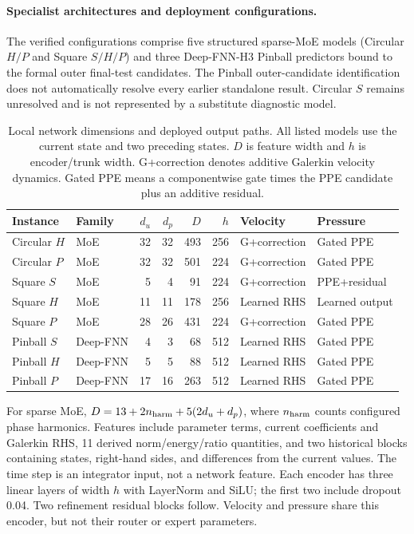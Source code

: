 \paragraph{Specialist architectures and deployment configurations.}
The verified configurations comprise five structured sparse-MoE
models (Circular $H/P$ and Square $S/H/P$) and three Deep-FNN-H3
Pinball predictors bound to the formal outer final-test candidates.
The Pinball outer-candidate identification does not automatically
resolve every earlier standalone result. Circular $S$ remains
unresolved and is not represented by a substitute diagnostic model.

\begin{table}[t]
\centering
\small
\setlength{\tabcolsep}{4pt}
\caption{Local network dimensions and deployed output paths. All
listed models use the current state and two preceding states.
$D$ is feature width and $h$ is encoder/trunk width. G+correction
denotes additive Galerkin velocity dynamics. Gated PPE means a
componentwise gate times the PPE candidate plus an additive residual.}
\label{tab:local_architecture_overview}
\begin{tabular}{@{}llrrrrll@{}}
\toprule
Instance & Family & $d_u$ & $d_p$ & $D$ & $h$ & Velocity & Pressure\\
\midrule
Circular $H$ & MoE & 32 & 32 & 493 & 256 & G+correction & Gated PPE\\
Circular $P$ & MoE & 32 & 32 & 501 & 224 & G+correction & Gated PPE\\
Square $S$ & MoE & 5 & 4 & 91 & 224 & G+correction & PPE+residual\\
Square $H$ & MoE & 11 & 11 & 178 & 256 & Learned RHS & Learned output\\
Square $P$ & MoE & 28 & 26 & 431 & 224 & G+correction & Gated PPE\\
Pinball $S$ & Deep-FNN & 4 & 3 & 68 & 512 & Learned RHS & Gated PPE\\
Pinball $H$ & Deep-FNN & 5 & 5 & 88 & 512 & Learned RHS & Gated PPE\\
Pinball $P$ & Deep-FNN & 17 & 16 & 263 & 512 & Learned RHS & Gated PPE\\
\bottomrule
\end{tabular}
\end{table}

For sparse MoE, $D=13+2n_{\rm harm}+5(2d_u+d_p)$, where
$n_{\rm harm}$ counts configured phase harmonics. Features include
parameter terms, current coefficients and Galerkin RHS, 11 derived
norm/energy/ratio quantities, and two historical blocks containing
states, right-hand sides, and differences from the current values.
The time step is an integrator input, not a network feature.
Each encoder has three linear layers of width $h$ with LayerNorm
and SiLU; the first two include dropout 0.04. Two refinement residual
blocks follow. Velocity and pressure share this encoder, but not
their router or expert parameters.


